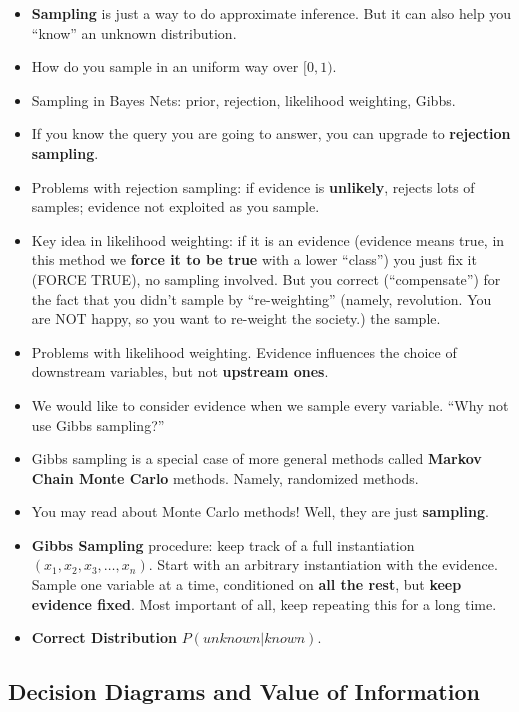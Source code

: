 \documentclass[twocolumn]{article}
\begin{document}
\begin{itemize}
\item \textbf{Sampling} is just a way to do approximate inference. But
  it can also help you ``know'' an unknown distribution.
\item How do you sample in an uniform way over $[0,1)$.
\item Sampling in Bayes Nets: prior, rejection, likelihood weighting,
  Gibbs.
\item If you know the query you are going to answer, you can upgrade
  to \textbf{rejection sampling}.
\item Problems with rejection sampling: if evidence is
  \textbf{unlikely}, rejects lots of samples; evidence not exploited
  as you sample.
\item Key idea in likelihood weighting: if it is an evidence (evidence
  means true, in this method we \textbf{force it to be true} with a
  lower ``class'') you just fix it (FORCE TRUE), no sampling
  involved. But you correct (``compensate'') for the fact that you
  didn't sample by ``re-weighting'' (namely, revolution. You are NOT
  happy, so you want to re-weight the society.) the sample.
\item Problems with likelihood weighting. Evidence influences the
  choice of downstream variables, but not \textbf{upstream ones}.
\item We would like to consider evidence when we sample every
  variable. ``Why not use Gibbs sampling?''
\item Gibbs sampling is a special case of more general methods called
  \textbf{Markov Chain Monte Carlo} methods. Namely, randomized
  methods.
\item You may read about Monte Carlo methods! Well, they are just
  \textbf{sampling}. 
\item \textbf{Gibbs Sampling} procedure: keep track of a full
  instantiation $(x_{1},x_{2},x_{3},\ldots,x_{n})$. Start with an
  arbitrary instantiation with the evidence. Sample one variable at a
  time, conditioned on \textbf{all the rest}, but \textbf{keep
    evidence fixed}. Most important of all, keep repeating this for a
  long time.
\item \textbf{Correct Distribution} $P(unknown|known)$.
\end{itemize}


\subsection{Decision Diagrams and Value of Information}
\label{sec:decis-diagr-value}
\end{document}
